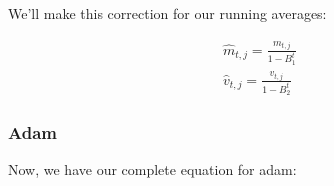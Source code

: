             We'll make this correction for our running averages:

            \begin{equation}
                \begin{gathered}
                    \widehat{m}_{t,j} = \frac{m_{t,j}}{1-B_1^t} \\
                    \widehat{v}_{t,j} = \frac{v_{t,j}}{1-B_2^t}
                \end{gathered}
            \end{equation}

        \subsubsection{Adam}

            Now, we have our complete equation for adam:\\

